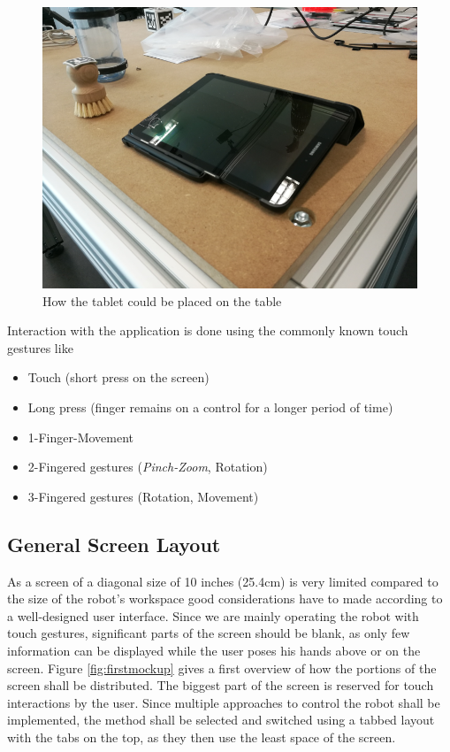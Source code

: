 \begin{figure}
	\caption{\label{fig:ui:tablet}How the tablet could be placed on the table}
	\includegraphics[width=\linewidth]{assets/chpt_concepts/tablet.png}
\end{figure}

Interaction with the application is done using the commonly known touch gestures like
\begin{itemize}
	\item Touch (short press on the screen)
	\item Long press (finger remains on a control for a longer period of time)
	\item 1-Finger-Movement
	\item 2-Fingered gestures (\textit{Pinch-Zoom}, Rotation)
	\item 3-Fingered gestures (Rotation, Movement)
\end{itemize}

\subsection{General Screen Layout}
\label{sec:ui:layout}
As a screen of a diagonal size of 10 inches (25.4cm) is very limited compared to the size of the robot's workspace good considerations have to made according to a well-designed user interface. Since we are mainly operating the robot with touch gestures, significant parts of the screen should be blank, as only few information can be displayed while the user poses his hands above or on the screen. Figure \ref{fig:firstmockup} gives a first overview of how the portions of the screen shall be distributed. The biggest part of the screen is reserved for touch interactions by the user. Since multiple approaches to control the robot shall be implemented, the method shall be selected and switched using a tabbed layout with the tabs on the top, as they then use the least space of the screen.

